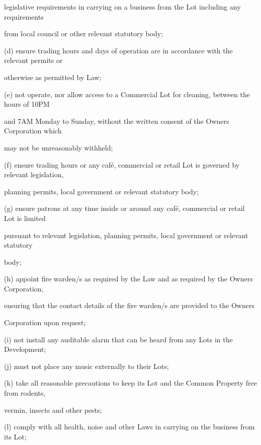 \documentclass{article}
\begin{document}
{\fontsize{10.02}{1}legislative requirements in carrying on a business from the Lot including any requirements }

{\fontsize{10.02}{1}from local council or other relevant statutory body; }

{\fontsize{9.962}{1}(d) ensure trading hours and days of operation are in accordance with the relevant permits or }

{\fontsize{10.02}{1}otherwise as permitted by Law; }

{\fontsize{9.962}{1}(e) not operate, nor allow access to a Commercial Lot for cleaning, between the hours of 10PM }

{\fontsize{10.02}{1}and 7AM Monday to Sunday, without the written consent of the Owners Corporation which }

\newpage

{\fontsize{10.02}{1}may not be unreasonably withheld; }

{\fontsize{9.962}{1}(f) ensure trading hours or any café, commercial or retail Lot is governed by relevant legislation, }

{\fontsize{10.02}{1}planning permits, local government or relevant statutory body; }

{\fontsize{9.962}{1}(g) ensure patrons at any time inside or around any café, commercial or retail Lot is limited }

{\fontsize{10.02}{1}pursuant to relevant legislation, planning permits, local government or relevant statutory }

{\fontsize{10.02}{1}body; }

{\fontsize{9.962}{1}(h) appoint fire warden/s as required by the Law and as required by the Owners Corporation, }

{\fontsize{10.02}{1}ensuring that the contact details of the fire warden/s are provided to the Owners }

{\fontsize{10.02}{1}Corporation upon request; }

{\fontsize{9.962}{1}(i) not install any auditable alarm that can be heard from any Lots in the Development; }

{\fontsize{9.962}{1}(j) must not place any music externally to their Lots; }

{\fontsize{9.962}{1}(k) take all reasonable precautions to keep its Lot and the Common Property free from rodents, }

{\fontsize{10.02}{1}vermin, insects and other pests; }

{\fontsize{9.962}{1}(l) comply with all health, noise and other Laws in carrying on the business from its Lot; }
\end{document}
